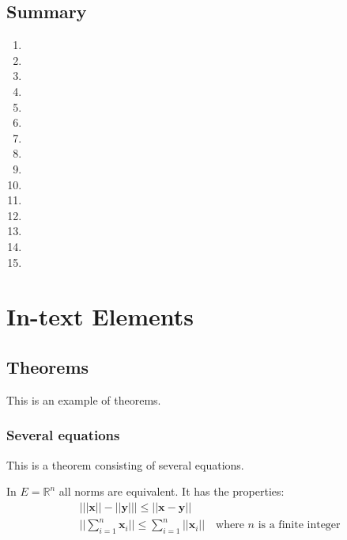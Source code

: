 \documentclass[11pt,fleqn]{book} %
\begin{document}
\section{Summary}
\begin{enumerate}
	\item \lipsum[1]
	\item \lipsum[2]
	\item \lipsum[3]
	\item \lipsum[4]
	\item \lipsum[5]
	\item \lipsum[6]
	\item \lipsum[7]
	\item \lipsum[8]
	\item \lipsum[9]
	\item \lipsum[10]
	\item \lipsum[11]
	\item \lipsum[12]
	\item \lipsum[13]
	\item \lipsum[14]
	\item \lipsum[15]
\end{enumerate}




\chapter{In-text Elements}

\section{Theorems}

This is an example of theorems.

\subsection{Several equations}
This is a theorem consisting of several equations.

\begin{theorem}
	In $E=\mathbb{R}^n$ all norms are equivalent. It has the properties:
	\begin{align}
		 & \big| ||\mathbf{x}|| - ||\mathbf{y}|| \big|\leq || \mathbf{x}- \mathbf{y}||                            \\
		 & ||\sum_{i=1}^n\mathbf{x}_i||\leq \sum_{i=1}^n||\mathbf{x}_i||\quad\text{where $n$ is a finite integer}
	\end{align}
\end{theorem}
\end{document}
